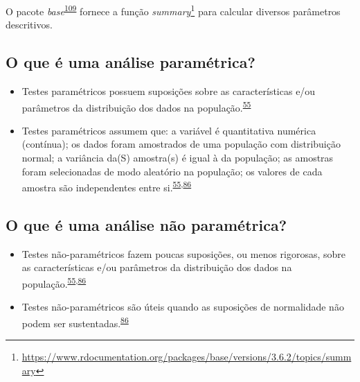 \documentclass[
  a4paper,
]{book}
\renewcommand{\href}[2]{#2\footnote{\url{#1}}}
\newenvironment{infobox}[1]
  {
  \begin{itemize}
  \renewcommand{\labelitemi}{
    \raisebox{-.7\height}[0pt][0pt]{
      {\setkeys{Gin}{width=3em,keepaspectratio}
        \texttt{[image: \#1]}}
    }
  }
  \setlength{\fboxsep}{1em}
  \begin{blackbox}
  \item
  }
  {
  \end{blackbox}
  \end{itemize}
  }
\begin{document}
\begin{infobox}{images/Rlogo}
O pacote \emph{base}\textsuperscript{\protect\hyperlink{ref-base-6}{109}} fornece a função \href{https://www.rdocumentation.org/packages/base/versions/3.6.2/topics/summary}{\emph{summary}} para calcular diversos parâmetros descritivos.

\end{infobox}

\hypertarget{o-que-uxe9-uma-anuxe1lise-paramuxe9trica}{%
\subsection{O que é uma análise paramétrica?}\label{o-que-uxe9-uma-anuxe1lise-paramuxe9trica}}

\begin{itemize}
\item
  Testes paramétricos possuem suposições sobre as características e/ou parâmetros da distribuição dos dados na população.\textsuperscript{\protect\hyperlink{ref-vetter2017}{55}}
\item
  Testes paramétricos assumem que: a variável é quantitativa numérica (contínua); os dados foram amostrados de uma população com distribuição normal; a variância da(S) amostra(s) é igual à da população; as amostras foram selecionadas de modo aleatório na população; os valores de cada amostra são independentes entre si.\textsuperscript{\protect\hyperlink{ref-vetter2017}{55},\protect\hyperlink{ref-Ali2016}{86}}
\end{itemize}

\hypertarget{o-que-uxe9-uma-anuxe1lise-nuxe3o-paramuxe9trica}{%
\subsection{O que é uma análise não paramétrica?}\label{o-que-uxe9-uma-anuxe1lise-nuxe3o-paramuxe9trica}}

\begin{itemize}
\item
  Testes não-paramétricos fazem poucas suposições, ou menos rigorosas, sobre as características e/ou parâmetros da distribuição dos dados na população.\textsuperscript{\protect\hyperlink{ref-vetter2017}{55},\protect\hyperlink{ref-Ali2016}{86}}
\item
  Testes não-paramétricos são úteis quando as suposições de normalidade não podem ser sustentadas.\textsuperscript{\protect\hyperlink{ref-Ali2016}{86}}
\end{itemize}
\end{document}

